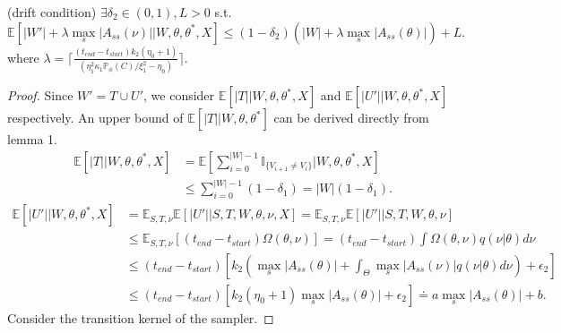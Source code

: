 \begin{theorem}(drift condition) $\exists \delta_2 \in (0, 1), L > 0$ 
  s.t. 
  $$\mathbb{E}\left[|W'| + \lambda \max_s |A_{ss}(\nu)| | W, \theta, \theta^*, X\right] \leq (1 - \delta_2)\left(|W| + \lambda \max_s |A_{ss}(\theta)| \right) + L.$$
where $\lambda = \lceil \frac{(t_{end} - t_{start})k_2(\eta_0 + 1)}{(\eta_1^2 \kappa_1 \mathbb{P}_\phi(C)/\xi_1^2 - \eta_0)} \rceil.$
\end{theorem}
\begin{proof}
Since $W' = T \cup U'$, we consider $\mathbb{E}[|T| | W, \theta, \theta^*, X]$ and $\mathbb{E}[|U'| | W, \theta, \theta^*, X]$ respectively.
An upper bound of $\mathbb{E}[|T| | W, \theta, \theta^*]$ can be derived directly from lemma 1.
\begin{align*}
\mathbb{E}[|T| | W, \theta, \theta^*, X] &= \mathbb{E}[\sum_{i = 0}^{|W| - 1} \mathbb{I}_{\{ V_{i + 1} \neq V_i \}}| W, \theta, \theta^*, X]\\
&\leq \sum_{i = 0}^{|W| - 1} (1 - \delta_1) = |W|(1 - \delta_1).
\end{align*}
\begin{align*}
\mathbb{E}[|U'| |W, \theta, \theta^*, X] &= \mathbb{E}_{S,T, \nu}\mathbb{E}[|U'| | S, T, W, \theta, \nu, X] = \mathbb{E}_{S,T, \nu}\mathbb{E}[|U'| | S, T, W, \theta, \nu] \\
& \leq \mathbb{E}_{S,T, \nu} \left[(t_{end} - t_{start})\Omega(\theta, \nu)\right] = (t_{end} - t_{start})\int \Omega(\theta, \nu) q(\nu | \theta) d\nu\\
& \leq (t_{end} - t_{start})\left[ k_2 \left(  \max_s|A_{ss}(\theta)| +  \int_\Theta \max_s|A_{ss}(\nu)|q(\nu | \theta)d\nu \right) + \epsilon_2 \right] \\
& \leq (t_{end} - t_{start}) \left[ k_2 (\eta_0 + 1) \max_s|A_{ss}(\theta)| + \epsilon_2 \right] \doteq a \max_s|A_{ss}(\theta)| + b.
\end{align*}
Consider the transition kernel of the sampler.


\end{proof}
